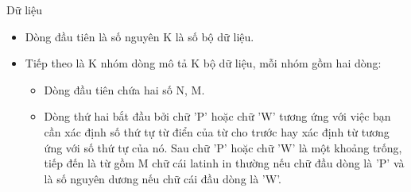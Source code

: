 Dữ liệu
\begin{itemize}
	\item     Dòng đầu tiên là số nguyên K là số bộ dữ liệu.   
	\item     Tiếp theo là K nhóm dòng mô tả K bộ dữ liệu, mỗi nhóm gồm hai dòng:    
\begin{itemize}
	\item       Dòng đầu tiên chứa hai số N, M.     
	\item       Dòng thứ hai bắt đầu bởi chữ 'P' hoặc chữ 'W' tương ứng với việc bạn cần xác định số thứ tự từ điển của từ cho trước hay xác định từ tương ứng với số thứ tự của nó. Sau chữ 'P' hoặc chữ 'W' là một khoảng trống, tiếp đến là từ gồm M chữ cái latinh in thường nếu chữ đầu dòng là 'P' và là số nguyên dương nếu chữ cái đầu dòng là 'W'.     
\end{itemize}
\end{itemize}
